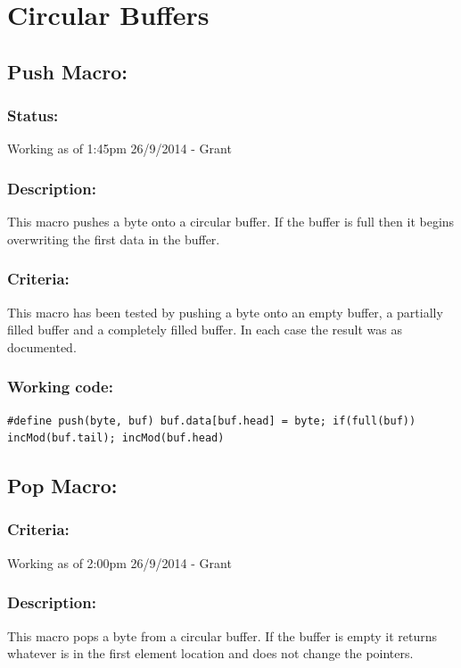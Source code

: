\documentclass[]{report}
\begin{document}
\newpage
\section{Circular Buffers}
\subsection{Push Macro:}
\subsubsection{Status:}
Working as of 1:45pm 26/9/2014 - Grant

\subsubsection{Description:}
This macro pushes a byte onto a circular buffer. If the buffer is full then it begins overwriting the first data in the buffer.

\subsubsection{Criteria:}
This macro has been tested by pushing a byte onto an empty buffer, a partially filled buffer and a completely filled buffer. In each case the result was as documented.

\subsubsection{Working code:}
\begin{lstlisting}
#define push(byte, buf) buf.data[buf.head] = byte; if(full(buf)) incMod(buf.tail); incMod(buf.head)
\end{lstlisting}

\subsection{Pop Macro:}
\subsubsection{Criteria:}
Working as of 2:00pm 26/9/2014 - Grant

\subsubsection{Description:}
This macro pops a byte from a circular buffer. If the buffer is empty it returns whatever is in the first element location and does not change the pointers.
\end{document}
